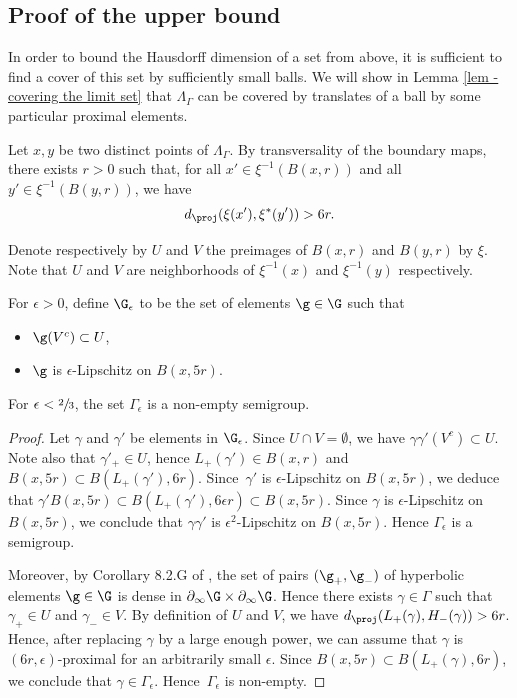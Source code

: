 \subsection{Proof of the upper bound}
In order to bound the Hausdorff dimension of a set from above, it is sufficient to find a cover of this set by sufficiently small balls. We will show in Lemma \ref{lem - covering the limit set} that $\Lambda_\Gamma$ can be covered by translates of a ball by some particular proximal elements.

Let $x,y$ be two distinct points of $\Lambda_\Gamma$. By transversality of the boundary maps, there exists $r>0$ such that, for all $x'\in \xi^{-1}(B(x,r))$ and all $y' \in \xi^{-1}(B(y,r))$, we have
\[d_\proj(\xi(x'), \xi^*(y')) > 6r.\]

Denote respectively by $U$ and $V$ the preimages of $B(x,r)$ and $B(y,r)$ by $\xi$. Note that $U$ and $V$ are neighborhoods of $\xi^{-1}(x)$ and $\xi^{-1}(y)$ respectively.

For $\epsilon>0$, define $\G_\epsilon$ to be the set of elements $\g\in \G$ such that
\begin{itemize}
\item $\g(V^c)\subset U$,
\item $\g$ is $\epsilon$-Lipschitz on $B(x, 5r)$.
\end{itemize}

\begin{prop}
For $\epsilon < \sfrac{2}{3}$, the set $\Gamma_\epsilon$ is a non-empty semigroup.
\end{prop}

\begin{proof}
Let $\gamma$ and $\gamma'$ be elements in $\G_\epsilon$. Since $U\cap V = \emptyset$, we have $\gamma\gamma'(V^c) \subset U$.
Note also that $\gamma'_+ \in U$, hence $L_+(\gamma')\in B(x,r)$ and $B(x,5r) \subset B(L_+(\gamma'),6r)$. Since~$\gamma'$ is $\epsilon$-Lipschitz on $B(x,5r)$, we deduce that $\gamma' B(x,5r) \subset B(L_+(\gamma'), 6\epsilon r) \subset B(x,5r)$. Since $\gamma$ is $\epsilon$-Lipschitz on $B(x,5r)$, we conclude that $\gamma \gamma'$ is $\epsilon^2$-Lipschitz on $B(x, 5r)$. Hence $\Gamma_\epsilon$ is a semigroup.

Moreover, by Corollary 8.2.G of \cite{Gromov}, the set of pairs $(\g_+,\g_-)$ of hyperbolic elements $\g\in\G$ is dense in $\partial_\infty \G\times\partial_\infty\G$. Hence there exists $\gamma \in \Gamma$ such that $\gamma_+ \in U$ and $\gamma_-\in V$. By definition of $U$ and $V$, we have $d_\proj(L_+(\gamma),H_-(\gamma)) > 6r$. Hence, after replacing $\gamma$ by a large enough power, we can assume that $\gamma$ is $(6r,\epsilon)$-proximal for an arbitrarily small $\epsilon$. Since $B(x,5r)\subset B(L_+(\gamma), 6r)$, we conclude that $\gamma \in \Gamma_\epsilon$. Hence~$\Gamma_\epsilon$ is non-empty.
\end{proof}


